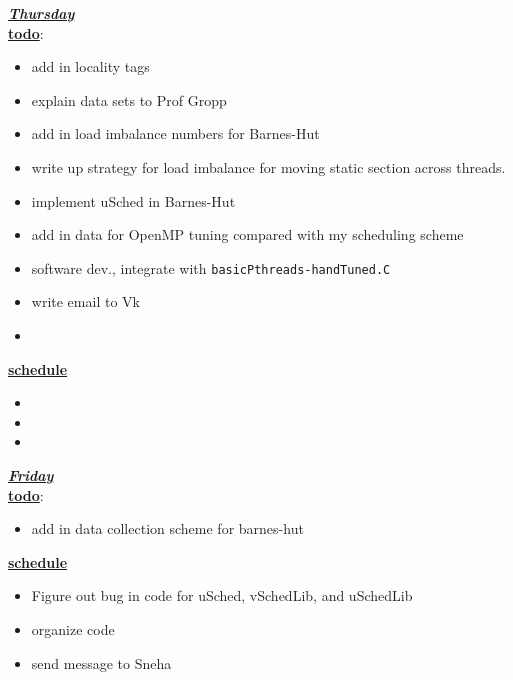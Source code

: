 \underline{\textbf{\textit{Thursday}}}\\
\underline{\textbf{todo}}:
\begin{itemize}

\item add in locality tags 
\item explain data sets to Prof Gropp
\item add in load imbalance numbers for Barnes-Hut
\item write up strategy for load imbalance for moving static section across threads.
\item implement uSched in Barnes-Hut


\item add in data for OpenMP tuning compared with my scheduling scheme
\item software dev., integrate with \texttt{basicPthreads-handTuned.C}
\item write email to Vk  
\item
\end{itemize}

\underline{\textbf{schedule}}\\
\begin{itemize}
\item
\item
\item
{}
\end{itemize}

\underline{\textbf{\textit{Friday}}}\\
\underline{\textbf{todo}}:
\begin{itemize}
\item add in data collection scheme for barnes-hut
\end{itemize}

\underline{\textbf{schedule}}\\
\begin{itemize}
\item Figure out bug in code  for uSched, vSchedLib, and uSchedLib
\item organize code 
\item send message to Sneha 
\end{itemize}


